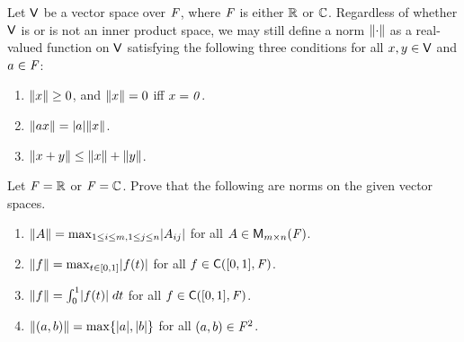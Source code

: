 \begin{defn}\label{6.1.14}
  Let \(\mathsf{V}\) be a vector space over \(\mathit{F}\), where \(\mathit{F}\) is either \(\mathbb{R}\) or \(\mathbb{C}\).
  Regardless of whether \(\mathsf{V}\) is or is not an inner product space, we may still define a norm \(\left\lVert\cdot\right\rVert\) as a real-valued function on \(\mathsf{V}\) satisfying the following three conditions for all \(x, y \in \mathsf{V}\) and \(a \in \mathit{F}\):
  \begin{enumerate}
    \item \(\left\lVert x\right\rVert \geq 0\), and \(\left\lVert x\right\rVert = 0\) iff \(x = \mathit{0}\).
    \item \(\norm{ax} = \abs{a} \norm{x}\).
    \item \(\left\lVert x + y\right\rVert \leq \left\lVert x\right\rVert + \left\lVert y\right\rVert\).
  \end{enumerate}
\end{defn}

\begin{ex}\label{ex:6.1.24}
  Let \(\mathit{F} = \mathbb{R}\) or \(\mathit{F} = \mathbb{C}\).
  Prove that the following are norms on the given vector spaces.
  \begin{enumerate}
    \item \(\norm{A} = \max_{1 \leq i \leq m, 1 \leq j \leq n} \abs{A_{i j}}\) for all \(A \in \mathsf{M}_{{m} \times n}({\mathit{F}})\).
    \item \(\norm{f} = \max_{t \in [0, 1]} \abs{f(t)}\) for all \(f \in \cfs([0, 1], \F)\).
    \item \(\norm{f} = \int_0^1 \abs{f(t)} \; dt\) for all \(f \in \cfs([0, 1], \F)\).
    \item \(\norm{(a, b)} = \max\set{\abs{a}, \abs{b}}\) for all \((a, b) \in \mathit{F}^2\).
  \end{enumerate}
\end{ex}


